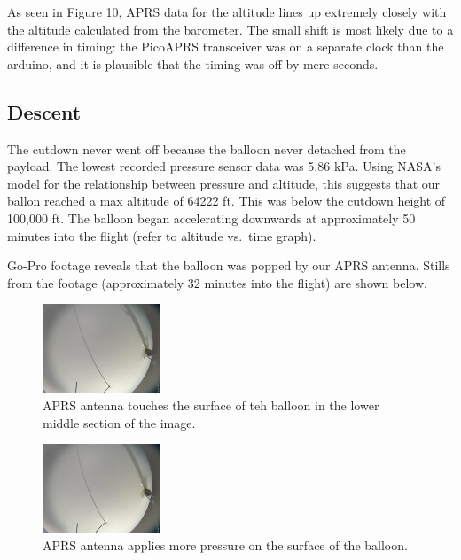 \documentclass[12pt,]{article}
\begin{document}
As seen in Figure 10, APRS data for the altitude lines up extremely
closely with the altitude calculated from the barometer. The small shift
is most likely due to a difference in timing: the PicoAPRS transceiver
was on a separate clock than the arduino, and it is plausible that the
timing was off by mere seconds.

\subsection{Descent}\label{descent}

The cutdown never went off because the balloon never detached from the
payload. The lowest recorded pressure sensor data was 5.86 kPa. Using
NASA's model for the relationship between pressure and altitude, this
suggests that our ballon reached a max altitude of 64222 ft. This was
below the cutdown height of 100,000 ft. The balloon began accelerating
downwards at approximately 50 minutes into the flight (refer to altitude
vs.~time graph).

Go-Pro footage reveals that the balloon was popped by our APRS antenna.
Stills from the footage (approximately 32 minutes into the flight) are
shown below.

\begin{figure}[h]

{\centering \includegraphics[height=100px]{assets/IMAGEBREAKA} 

}

\caption{\label{fig:figs} APRS antenna touches the surface of teh balloon in the lower middle section of the image.}\label{fig:imagebreaka}
\end{figure}

\begin{figure}[h]

{\centering \includegraphics[height=100px]{assets/IMAGEBREAKB} 

}

\caption{\label{fig:figs} APRS antenna applies more pressure on the surface of the balloon.}\label{fig:imagebreakb}
\end{figure}
\end{document}

